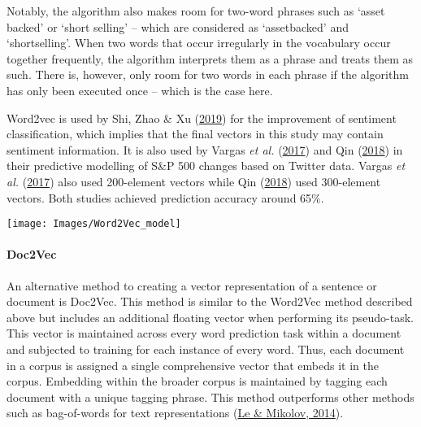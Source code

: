 \documentclass[11pt,preprint, authoryear]{elsarticle}
\let\origfigure\figure
\let\endorigfigure\endfigure
\renewenvironment{figure}[1][2] {
    \expandafter\origfigure\expandafter[H]
} {
    \endorigfigure
}
\numberwithin{equation}{section}
\numberwithin{figure}{section}
\numberwithin{table}{section}
\begin{document}
Notably, the algorithm also makes room for two-word phrases such as
`asset backed' or `short selling' -- which are considered as
`assetbacked' and `shortselling'. When two words that occur irregularly
in the vocabulary occur together frequently, the algorithm interprets
them as a phrase and treats them as such. There is, however, only room
for two words in each phrase if the algorithm has only been executed
once -- which is the case here.

Word2vec is used by Shi, Zhao \& Xu
(\protect\hyperlink{ref-shi2019word2vec}{2019}) for the improvement of
sentiment classification, which implies that the final vectors in this
study may contain sentiment information. It is also used by Vargas
\emph{et al.} (\protect\hyperlink{ref-vargas2017deep}{2017}) and Qin
(\protect\hyperlink{ref-qin230natural}{2018}) in their predictive
modelling of S\&P 500 changes based on Twitter data. Vargas \emph{et
al.} (\protect\hyperlink{ref-vargas2017deep}{2017}) also used
200-element vectors while Qin
(\protect\hyperlink{ref-qin230natural}{2018}) used 300-element vectors.
Both studies achieved prediction accuracy around 65\%.

\begin{figure}[H]

{\centering \texttt{[image: Images/Word2Vec\_model]}

}

\caption{Word2Vec Model \label{Figure1}}\label{fig:Word2Vec Model}
\end{figure}

\hypertarget{doc2vec}{%
\paragraph{\texorpdfstring{Doc2Vec
\label{Doc2Vec}}{Doc2Vec }}\label{doc2vec}}

An alternative method to creating a vector representation of a sentence
or document is Doc2Vec. This method is similar to the Word2Vec method
described above but includes an additional floating vector when
performing its pseudo-task. This vector is maintained across every word
prediction task within a document and subjected to training for each
instance of every word. Thus, each document in a corpus is assigned a
single comprehensive vector that embeds it in the corpus. Embedding
within the broader corpus is maintained by tagging each document with a
unique tagging phrase. This method outperforms other methods such as
bag-of-words for text representations
(\protect\hyperlink{ref-le2014distributed}{Le \& Mikolov, 2014}).
\end{document}
